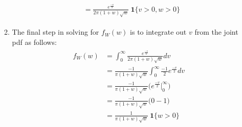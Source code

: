 \documentclass[11pt]{article}
\theoremstyle{definition}
\newcommand{\1}[1]{\mathbf{1} \left \{ #1 \right \}}
\begin{document}
\begin{itemize}
\begin{enumerate}
\begin{align*}
\begin{split}
            &= \frac{e^{\frac{-v}{2}}}{2\pi (1+w) \sqrt{w}} \ \textbf{1}\{v>0, w>0\}
        \end{split}
    \end{align*}
    \item The final step in solving for $f_W (w)$ is to integrate out $v$ from the joint pdf as follows:
    \begin{align*}
        \begin{split}
            f_W (w) &= \int_0^{\infty} \frac{e^{\frac{-v}{2}}}{2\pi (1+w) \sqrt{w}} dv \\
            &= \frac{-1}{\pi (1+w) \sqrt{w}} \int_0^{\infty} \frac{-1}{2} e^{\frac{-v}{2}} dv \\
            &= \frac{-1}{\pi (1+w) \sqrt{w}} \Big(e^{\frac{-v}{2}} \Big|_0^{\infty}\Big) \\
            &= \frac{-1}{\pi (1+w) \sqrt{w}} \big(0 - 1\big) \\
            &= \frac{1}{\pi (1+w) \sqrt{w}} \ \textbf{1}\{w>0\}
        \end{split}
    \end{align*}
\end{enumerate}


\end{itemize}
\end{document}
